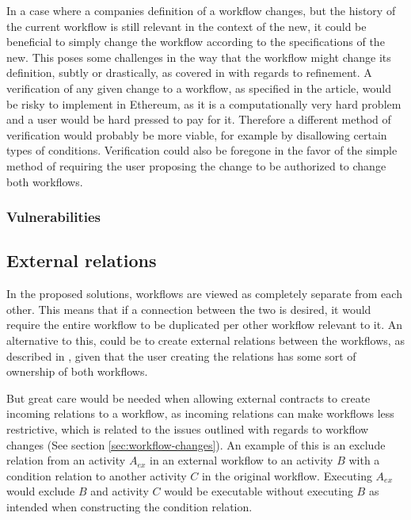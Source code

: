 \documentclass{article}
\begin{document}
		In a case where a companies definition of a workflow changes, but the history of the current workflow is still relevant in the context of the new, it could be beneficial to simply change the workflow according to the specifications of the new.
		This poses some challenges in the way that the workflow might change its definition, subtly or drastically, as covered in \cite{hierarchical-declarative-modelling} with regards to refinement.
		A verification of any given change to a workflow, as specified in the article, would be risky to implement in Ethereum, as it is a computationally very hard problem and a user would be hard pressed to pay for it.
		Therefore a different method of verification would probably be more viable, for example by disallowing certain types of conditions.
		Verification could also be foregone in the favor of the simple method of requiring the user proposing the change to be authorized to change both workflows. 

			\subsubsection{Vulnerabilities}

		\subsection{External relations}
		\label{sec:external-relations}
		In the proposed solutions, workflows are viewed as completely separate from each other. 
		This means that if a connection between the two is desired, it would require the entire workflow to be duplicated per other workflow relevant to it.
		An alternative to this, could be to create external relations between the workflows, as described in \cite{distributed-workflows}, given that the user creating the relations has some sort of ownership of both workflows.

		But great care would be needed when allowing external contracts to create incoming relations to a workflow, as incoming relations can make workflows less restrictive, which is related to the issues outlined with regards to workflow changes (See section \ref{sec:workflow-changes}). 
		An example of this is an exclude relation from an activity $A_{ex}$ in an external workflow to an activity $B$ with a condition relation to another activity $C$ in the original workflow. 
		Executing $A_{ex}$ would exclude $B$ and activity $C$ would be executable without executing $B$ as intended when constructing the condition relation.
\end{document}
